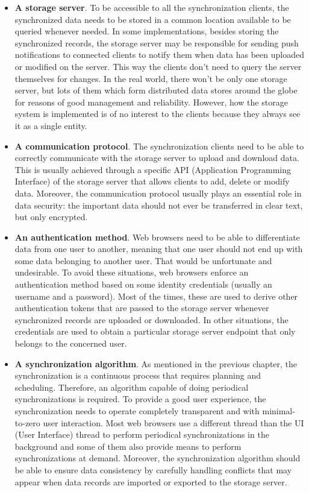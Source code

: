 \begin{itemize}
  \item \textbf{A storage server}. To be accessible to all the synchronization clients, the synchronized data needs to be stored in a common location available to be queried whenever needed. In some implementations, besides storing the synchronized records, the storage server may be responsible for sending push notifications to connected clients to notify them when data has been uploaded or modified on the server. This way the clients don't need to query the server themselves for changes. In the real world, there won't be only one storage server, but lots of them which form distributed data stores around the globe for reasons of good management and reliability. However, how the storage system is implemented is of no interest to the clients because they always see it as a single entity.

  \item \textbf{A communication protocol}. The synchronization clients need to be able to correctly communicate with the storage server to upload and download data. This is usually achieved through a specific API (Application Programming Interface) of the storage server that allows clients to add, delete or modify data. Moreover, the communication protocol usually plays an essential role in data security: the important data should not ever be transferred in clear text, but only encrypted.

  \item \textbf{An authentication method}. Web browsers need to be able to differentiate data from one user to another, meaning that one user should not end up with some data belonging to another user. That would be unfortunate and undesirable. To avoid these situations, web browsers enforce an authentication method based on some identity credentials (usually an username and a password). Most of the times, these are used to derive other authentication tokens that are passed to the storage server whenever synchronized records are uploaded or downloaded. In other situations, the credentials are used to obtain a particular storage server endpoint that only belongs to the concerned user.

  \item \textbf{A synchronization algorithm}. As mentioned in the previous chapter, the synchronization is a continuous process that requires planning and scheduling. Therefore, an algorithm capable of doing periodical synchronizations is required. To provide a good user experience, the synchronization needs to operate completely transparent and with minimal-to-zero user interaction. Most web browsers use a different thread than the UI (User Interface) thread to perform periodical synchronizations in the background and some of them also provide means to perform synchronizations at demand. Moreover, the synchronization algorithm should be able to ensure data consistency by carefully handling conflicts that may appear when data records are imported or exported to the storage server.
\end{itemize}

